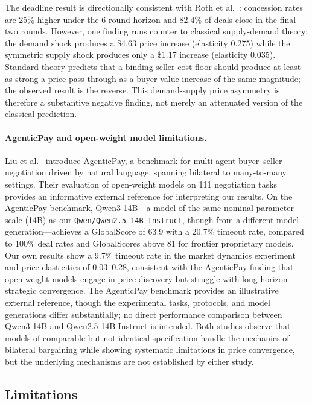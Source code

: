 The deadline result is directionally consistent with Roth et al.~\cite{roth1988deadline}: concession rates are 25\% higher under the 6-round horizon and 82.4\% of deals close in the final two rounds.  However, one finding runs counter to classical supply-demand theory: the demand shock produces a \$4.63 price increase (elasticity 0.275) while the symmetric supply shock produces only a \$1.17 increase (elasticity 0.035).  Standard theory predicts that a binding seller cost floor should produce at least as strong a price pass-through as a buyer value increase of the same magnitude; the observed result is the reverse.  This demand-supply price asymmetry is therefore a substantive negative finding, not merely an attenuated version of the classical prediction.

\paragraph{AgenticPay and open-weight model limitations.}
Liu et al.~\cite{liu2026agenticpay} introduce AgenticPay, a benchmark for multi-agent buyer--seller negotiation driven by natural language, spanning bilateral to many-to-many settings.  Their evaluation of open-weight models on 111 negotiation tasks provides an informative external reference for interpreting our results.  On the AgenticPay benchmark, Qwen3-14B---a model of the same nominal parameter scale (14B) as our \texttt{Qwen/Qwen2.5-14B-Instruct}, though from a different model generation---achieves a GlobalScore of 63.9 with a 20.7\% timeout rate, compared to 100\% deal rates and GlobalScores above 81 for frontier proprietary models.  Our own results show a 9.7\% timeout rate in the market dynamics experiment and price elasticities of 0.03--0.28, consistent with the AgenticPay finding that open-weight models engage in price discovery but struggle with long-horizon strategic convergence.  The AgenticPay benchmark provides an illustrative external reference, though the experimental tasks, protocols, and model generations differ substantially; no direct performance comparison between Qwen3-14B and Qwen2.5-14B-Instruct is intended.  Both studies observe that models of comparable but not identical specification handle the mechanics of bilateral bargaining while showing systematic limitations in price convergence, but the underlying mechanisms are not established by either study.

\subsection{Limitations}
\label{sec:disc-limitations}

